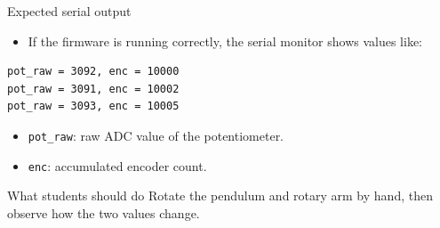 \documentclass[aspectratio=169]{beamer}
\begin{document}
\begin{frame}[fragile]{Expected serial output}

\begin{itemize}
    \item If the firmware is running correctly, the serial monitor shows values like:
\end{itemize}

\vspace{0.2cm}

\begin{lstlisting}
pot_raw = 3092, enc = 10000
pot_raw = 3091, enc = 10002
pot_raw = 3093, enc = 10005
\end{lstlisting}

\vspace{0.2cm}

\begin{itemize}
    \item \texttt{pot\_raw}: raw ADC value of the potentiometer.
    \vspace{0.2cm}

    \item \texttt{enc}: accumulated encoder count.
\end{itemize}

\vspace{0.2cm}

\begin{block}{What students should do}
\small
Rotate the pendulum and rotary arm by hand, then observe how the two values change.
\end{block}

\end{frame}
\end{document}
